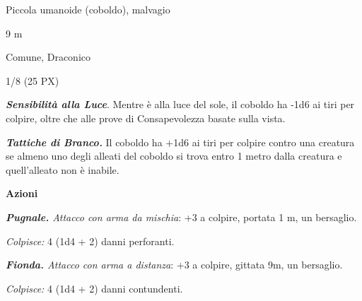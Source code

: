 \begin{multicols}{2}
{
\begin{description}[noitemsep, topsep=0pt, parsep=0pt, partopsep=0pt, itemsep=1pt, leftmargin=2.35cm,  labelwidth=2.2cm, itemindent=0cm, listparindent=0pt] %
\setlength{\baselineskip}{10pt}
\item[\textbf{Taglia/Tipo}] Piccola umanoide (coboldo), malvagio
\item[\textbf{Caratt.}] 
\item[\textbf{Punti Ferita}] 
\item[\textbf{Movimento}] 9 m
\item[\textbf{Tiri Salvez.}] 
\item[\textbf{Sensi}] 
\item[\textbf{Linguaggi}] Comune, Draconico
\item[\textbf{Sfida}] 1/8 (25 PX)
\end{description}
\smallskip

\emph{\textbf{Sensibilità alla Luce}}. Mentre è alla luce del sole, il coboldo ha -1d6 ai tiri per colpire, oltre che alle prove di Consapevolezza basate sulla vista.

\emph{\textbf{Tattiche di Branco.}} Il coboldo ha +1d6 ai tiri per colpire contro una creatura se almeno uno degli alleati del coboldo si trova entro 1 metro dalla creatura e quell'alleato non è inabile.

\textbf{Azioni}

\emph{\textbf{Pugnale.} Attacco con arma da mischia}: +3 a colpire, portata 1 m, un bersaglio.

\emph{Colpisce:} 4 (1d4 + 2) danni perforanti.

\emph{\textbf{Fionda.} Attacco con arma a distanza}: +3 a colpire, gittata 9m, un bersaglio.

\emph{Colpisce:} 4 (1d4 + 2) danni contundenti.

}
\end{multicols}
